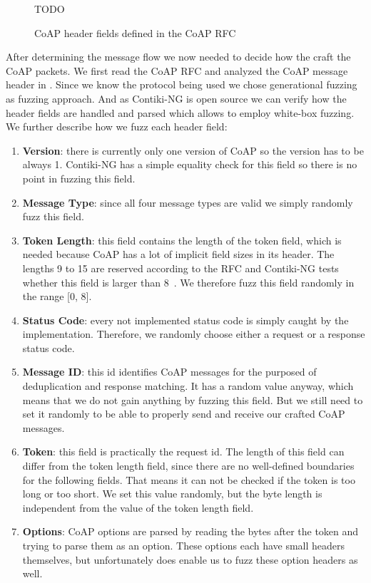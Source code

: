 \begin{figure}[h]
		\centering
		TODO
		\caption{CoAP header fields defined in the CoAP RFC~\cite{RFC7252}}
		\label{figure:coap_header}
\end{figure}

After determining the message flow we now needed to decide how the craft the CoAP packets. We first read the CoAP RFC and analyzed the CoAP message header in . Since we know the protocol being used we chose generational fuzzing as fuzzing approach. And as Contiki-NG is open source we can verify how the header fields are handled and parsed which allows to employ white-box fuzzing. We further describe how we fuzz each header field:
\begin{enumerate}
	\item \textbf{Version}: there is currently only one version of CoAP so the version has to be always 1. Contiki-NG has a simple equality check for this field so there is no point in fuzzing this field.
	\item \textbf{Message Type}: since all four message types are valid we simply randomly fuzz this field.
	\item \textbf{Token Length}: this field contains the length of the token field, which is needed because CoAP has a lot of implicit field sizes in its header. The lengths 9 to 15 are reserved according to the RFC and Contiki-NG tests whether this field is larger than 8~\cite{RFC7252}. We therefore fuzz this field randomly in the range [0, 8].
	\item \textbf{Status Code}: every not implemented status code is simply caught by the implementation. Therefore, we randomly choose either a request or a response status code.
	\item \textbf{Message ID}: this id identifies CoAP messages for the purposed of deduplication and response matching. It has a random value anyway, which means that we do not gain anything by fuzzing this field. But we still need to set it randomly to be able to properly send and receive our crafted CoAP messages.
	\item \textbf{Token}: this field is practically the request id. The length of this field can differ from the token length field, since there are no well-defined boundaries for the following fields. That means it can not be checked if the token is too long or too short. We set this value randomly, but the byte length is independent from the value of the token length field.
	\item \textbf{Options}: CoAP options are parsed by reading the bytes after the token and trying to parse them as an option. These options each have small headers themselves, but unfortunately \scapy does enable us to fuzz these option headers as well.


\end{enumerate}
